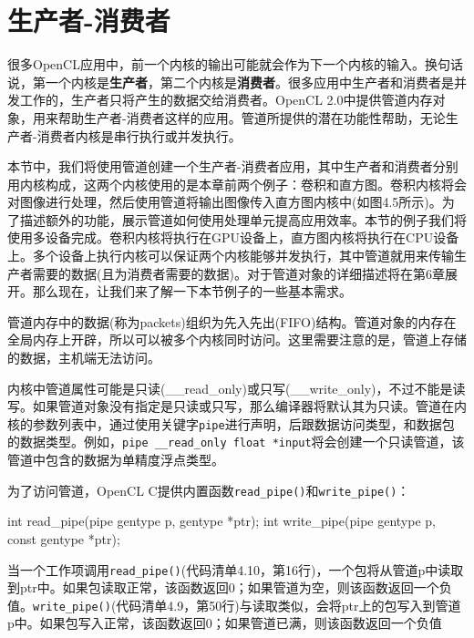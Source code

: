 \section{生产者-消费者}

很多OpenCL应用中，前一个内核的输出可能就会作为下一个内核的输入。换句话说，第一个内核是\textbf{生产者}，第二个内核是\textbf{消费者}。很多应用中生产者和消费者是并发工作的，生产者只将产生的数据交给消费者。OpenCL 2.0中提供管道内存对象，用来帮助生产者-消费者这样的应用。管道所提供的潜在功能性帮助，无论生产者-消费者内核是串行执行或并发执行。

本节中，我们将使用管道创建一个生产者-消费者应用，其中生产者和消费者分别用内核构成，这两个内核使用的是本章前两个例子：卷积和直方图。卷积内核将会对图像进行处理，然后使用管道将输出图像传入直方图内核中(如图4.5所示)。为了描述额外的功能，展示管道如何使用处理单元提高应用效率。本节的例子我们将使用多设备完成。卷积内核将执行在GPU设备上，直方图内核将执行在CPU设备上。多个设备上执行内核可以保证两个内核能够并发执行，其中管道就用来传输生产者需要的数据(且为消费者需要的数据)。对于管道对象的详细描述将在第6章展开。那么现在，让我们来了解一下本节例子的一些基本需求。

管道内存中的数据(称为packets)组织为先入先出(FIFO)结构。管道对象的内存在全局内存上开辟，所以可以被多个内核同时访问。这里需要注意的是，管道上存储的数据，主机端无法访问。

内核中管道属性可能是只读(\_\allowbreak{}\_\allowbreak{}read\_\allowbreak{}only)或只写(\_\allowbreak{}\_\allowbreak{}write\_\allowbreak{}only)，不过不能是读写。如果管道对象没有指定是只读或只写，那么编译器将默认其为只读。管道在内核的参数列表中，通过使用关键字\texttt{pipe}进行声明，后跟数据访问类型，和数据包的数据类型。例如，\texttt{pipe \_\_read\_only float *input}将会创建一个只读管道，该管道中包含的数据为单精度浮点类型。


为了访问管道，OpenCL C提供内置函数\texttt{read\_pipe()}和\texttt{write\_pipe()}：

\begin{codebox}[cpp]
int read_pipe(pipe gentype p, gentype *ptr);
int write_pipe(pipe gentype p, const gentype *ptr);
\end{codebox}

当一个工作项调用\texttt{read\_pipe()}(代码清单4.10，第16行)，一个包将从管道p中读取到ptr中。如果包读取正常，该函数返回0；如果管道为空，则该函数返回一个负值。\texttt{write\_pipe()}(代码清单4.9，第50行)与读取类似，会将ptr上的包写入到管道p中。如果包写入正常，该函数返回0；如果管道已满，则该函数返回一个负值

